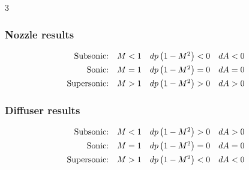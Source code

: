 \documentclass[9pt, landscape, a4paper]{article}
\begin{document}
\begin{multicols*}{3}
\subsubsection{Nozzle results}
\[
  \begin{array}{r@{\quad}c@{\quad}c@{\quad}c}
    \text{Subsonic:} & M < 1 & dp\left(1 - M^2\right) < 0 & dA < 0\\[1ex]
    \text{Sonic:} & M = 1 & dp\left(1 - M^2\right) = 0 & dA = 0\\[1ex]
    \text{Supersonic:} & M > 1 & dp\left(1 - M^2\right) > 0 & dA > 0
  \end{array}
\]

\subsubsection{Diffuser results}
\[
  \begin{array}{r@{\quad}c@{\quad}c@{\quad}c}
    \text{Subsonic:} & M < 1 & dp\left(1 - M^2\right) > 0 & dA > 0\\[1ex]
    \text{Sonic:} & M = 1 & dp\left(1 - M^2\right) = 0 & dA = 0\\[1ex]
    \text{Supersonic:} & M > 1 & dp\left(1 - M^2\right) < 0 & dA < 0
  \end{array}
\]


\end{multicols*}
\end{document}
